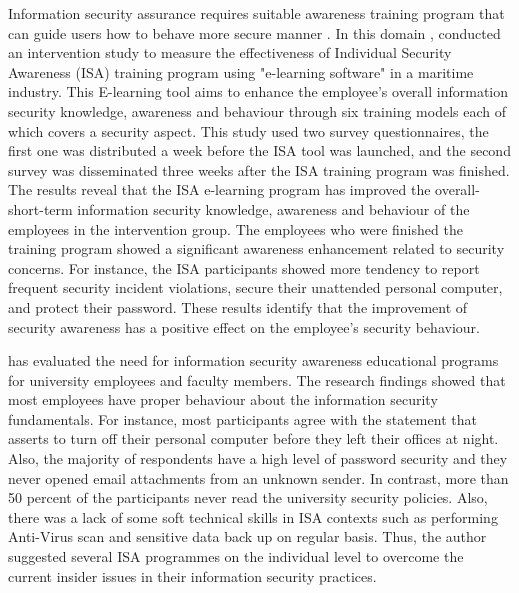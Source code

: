 Information security assurance requires suitable awareness training program that can guide users how to behave more secure manner \cite{safa2015information}. In this domain , \citet{merete2009effects} conducted an intervention study to measure the effectiveness of Individual Security  Awareness (ISA) training program using "e-learning software" in a maritime industry. This E-learning tool aims to enhance the employee's overall information security knowledge, awareness and behaviour through six training models each of which covers a security aspect. This study used two survey questionnaires, the first one was distributed a week before the ISA tool was launched, and the second survey was disseminated three weeks after the ISA training program was finished. The results reveal that the ISA e-learning program has improved the overall- short-term information security knowledge, awareness and behaviour of the employees in the intervention group. The employees who were finished the training program showed a significant awareness enhancement related to security concerns. For instance, the ISA participants showed more tendency to report frequent security incident violations, secure their unattended personal computer, and protect their password. These results identify that the improvement of security awareness has a positive effect on the employee's security behaviour.

\citet{Katz2005} has evaluated the need for information security awareness educational programs for university employees and faculty members. The research findings showed that most employees have proper behaviour about the information security fundamentals. For instance, most participants agree with the statement that asserts to turn off their personal computer before they left their offices at night. Also, the majority of respondents have a high level of password security and they never opened email attachments from an unknown sender. In contrast, more than 50 percent of the participants never read the university security policies. Also, there was a lack of some soft technical skills in ISA contexts such as performing Anti-Virus scan and sensitive data back up on regular basis. Thus, the author suggested several ISA programmes on the individual level to overcome the current insider issues in their information security practices.

